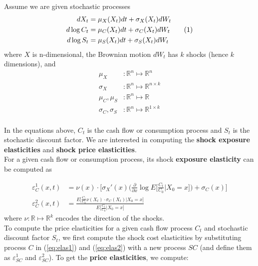 \documentclass[12pt]{article}
\newcommand\numberthis{\addtocounter{equation}{1}\tag{\theequation}}
\begin{document}
Assume we are given stochastic processes
\begin{align*}
d X_t & = \mu_X (X_t) dt + \sigma_X (X_t) d W_t \\
d \log C_t & = \mu_C (X_t) dt + \sigma_C (X_t) d W_t  \numberthis \label{eq:condition} \\
d \log S_t & = \mu_S (X_t) dt + \sigma_S (X_t) d W_t
\end{align*}
where $X$ is n-dimensional, the Brownian motion $d W_t$ has $k$ shocks (hence $k$ dimensions), and
\begin{align*}
  \mu_X &  : \mathbb{R}^n \mapsto \mathbb{R}^n\\
 \sigma_X& : \mathbb{R}^n \mapsto \mathbb{R}^{n \times k} \\
  \mu_C, \mu_S &  : \mathbb{R}^n \mapsto \mathbb{R} \\
\sigma_C,  \sigma_S  & : \mathbb{R}^n \mapsto \mathbb{R}^{1 \times k} \\
\end{align*}

In the equations above, $C_t$ is the cash flow or consumption process and $S_t$ is the stochastic discount factor. We are interested in computing the \textbf{shock exposure elasticities} and \textbf{shock price elasticities}. \\


For a given cash flow or consumption process, its shock \textbf{exposure elasticity} can be computed as

\begin{align}
 \varepsilon_C^1 (x,t) & = \nu(x) \cdot \Bigg[ \sigma_X'(x) \Bigg( \frac{\partial}{\partial x} \log E \Big[  \frac{C_t}{C_0} | X_0 = x \Big] \Bigg) + \sigma_C (x) \Bigg]  \label{eq:elas1} \\
 \varepsilon_C^2 (x,t) & = \frac{  E \Big[ \frac{C_t}{C_0} \nu(X_t) \cdot \sigma_C (X_t)  | X_0=x \Big] }{ E \Big[  \frac{C_t}{C_0}   | X_0 = x \Big] }  \label{eq:elas2}
\end{align}
where $\nu : \mathbb{R} \mapsto \mathbb{R}^k$ encodes the direction of the shocks. \\

To compute the price elasticities for a given cash flow process $C_t$ and stochastic discount factor $S_t$, we first compute the shock cost elasticities by substituting process $C$ in (\ref{eq:elas1}) and (\ref{eq:elas2}) with a new process $SC$ (and define them as $\varepsilon_{SC}^1$ and $ \varepsilon_{SC}^2 $). To get the \textbf{price elasticities}, we compute:
\end{document}
